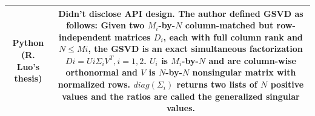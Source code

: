 \begin{center}
{\begin{tabular}{|c|c|}
            \\\hline
            Python (R. Luo's thesis) &  \makecell[l]{Didn't disclose API design. The author defined GSVD as follows: \\
            Given two $M_i$-by-$N$ column-matched but row-independent matrices $D_{i}$, \\ each with full column rank and $N \leq Mi$, the GSVD is an exact \\ simultaneous factorization $Di = Ui \Sigma_i V^T, i = 1, 2$. $U_i$ is $M_i$-by-$N$ and \\ are column-wise orthonormal and $V$ is $N$-by-$N$ nonsingular matrix with\\ normalized rows. $diag(\Sigma_i)$ returns two lists of $N$ positive values and \\the ratios are called the generalized singular values.} \\ \hline
        \end{tabular}
} 
\end{center} 
